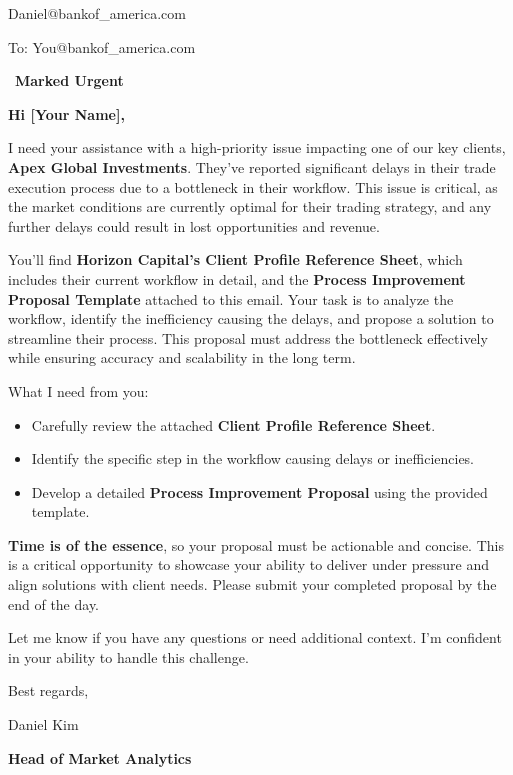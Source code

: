 \documentclass[11pt]{article}
\begin{document}
\begin{tcolorbox}[enhanced, colback=white, colframe=navy, arc=1.5mm,
    boxrule=0.6pt, left=6mm, right=6mm, top=3mm, bottom=4mm,
    colbacktitle=navy, coltitle=white, fonttitle=\bfseries,
    title={\textsc{Bank of America}\hspace{6mm}{\color{pdfred!70}Urgent!!}
    High-Priority Client Issue Requires Immediate Attention}]
\avatar{\faUserTie}\hspace{3mm}%
\begin{minipage}[c]{0.55\linewidth}
Daniel@bankof\_america.com\par
To: You@bankof\_america.com
\end{minipage}\hfill
{\small\color{pdfred}\faEnvelope\ \textbf{Marked Urgent}}
\par\smallskip{\color{pdfred!40}\rule{\linewidth}{0.4pt}}\par\medskip

\textbf{Hi [Your Name],}

I need your assistance with a high-priority issue impacting one of our key
clients, \textbf{Apex Global Investments}. They've reported significant delays
in their trade execution process due to a bottleneck in their workflow. This
issue is critical, as the market conditions are currently optimal for their
trading strategy, and any further delays could result in lost opportunities
and revenue.

You'll find \textbf{Horizon Capital's Client Profile Reference Sheet}, which
includes their current workflow in detail, and the \textbf{Process Improvement
Proposal Template} attached to this email. Your task is to analyze the
workflow, identify the inefficiency causing the delays, and propose a solution
to streamline their process. This proposal must address the bottleneck
effectively while ensuring accuracy and scalability in the long term.

What I need from you:
\begin{itemize}[leftmargin=1.5em, itemsep=2pt]
  \item Carefully review the attached \textbf{Client Profile Reference Sheet}.
  \item Identify the specific step in the workflow causing delays or
  inefficiencies.
  \item Develop a detailed \textbf{Process Improvement Proposal} using the
  provided template.
\end{itemize}

\textbf{Time is of the essence}, so your proposal must be actionable and
concise. This is a critical opportunity to showcase your ability to deliver
under pressure and align solutions with client needs. Please submit your
completed proposal by the end of the day.

Let me know if you have any questions or need additional context. I'm
confident in your ability to handle this challenge.

\medskip
Best regards,\par\medskip
Daniel Kim\par
\textbf{Head of Market Analytics}
\end{tcolorbox}
\medskip
\end{document}
